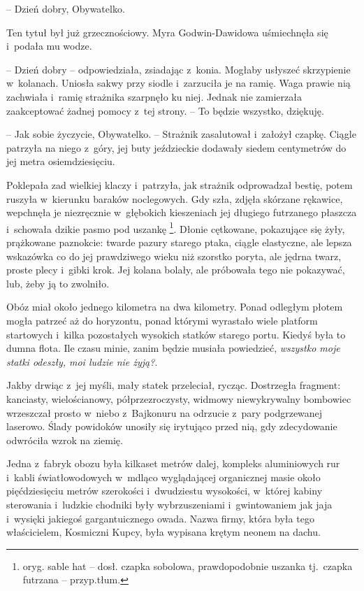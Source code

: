 \documentclass[oneside,polish,11pt,sfheadings]{mwbk}
\begin{document}
-- Dzień dobry, Obywatelko.

Ten tytuł był już grzecznościowy. Myra Godwin-Dawidowa uśmiechnęła się i~podała mu wodze.

-- Dzień dobry -- odpowiedziała, zsiadając z~konia. Mogłaby usłyszeć
skrzypienie w~kolanach. Uniosła sakwy przy siodle i~zarzuciła je na
ramię. Waga prawie nią zachwiała i~ramię strażnika szarpnęło ku niej.
Jednak nie zamierzała zaakceptować żadnej pomocy z~tej strony. -- To
będzie wszystko, dziękuję.

-- Jak sobie życzycie, Obywatelko. -- Strażnik zasalutował i~założył
czapkę. Ciągle patrzyła na niego z~góry, jej buty jeździeckie dodawały
siedem centymetrów do jej metra osiemdziesięciu.

Poklepała zad wielkiej klaczy i~patrzyła, jak strażnik odprowadzał
bestię, potem ruszyła w~kierunku baraków noclegowych. Gdy szła, zdjęła
skórzane rękawice, wepchnęła je niezręcznie w~głębokich kieszeniach jej
długiego futrzanego płaszcza i~schowała dzikie pasmo pod uszankę \footnote{
oryg. sable hat -- dosł. czapka sobolowa, prawdopodobnie uszanka tj.~czapka futrzana -- przyp.tłum.}. Dłonie cętkowane, pokazujące się żyły,
prążkowane paznokcie: twarde pazury starego ptaka, ciągle elastyczne,
ale lepsza wskazówka co do jej prawdziwego wieku niż szorstko poryta,
ale jędrna twarz, proste plecy i~gibki krok. Jej kolana bolały, ale
próbowała tego nie pokazywać, lub, żeby ją to zwolniło.

Obóz miał około jednego kilometra na dwa kilometry. Ponad odległym
płotem mogła patrzeć aż do horyzontu, ponad którymi wyrastało wiele
platform startowych i~kilka pozostałych wysokich statków starego portu.
Kiedyś była to dumna flota. Ile czasu minie, zanim będzie musiała
powiedzieć, \textit{wszystko moje statki odeszły, moi ludzie nie żyją?}.

Jakby drwiąc z~jej myśli, mały statek przeleciał, rycząc. Dostrzegła
fragment: kanciasty, wielościanowy, półprzezroczysty, widmowy
niewykrywalny bombowiec wrzeszczał prosto w~niebo z~Bajkonuru na
odrzucie z~pary podgrzewanej laserowo. Ślady powidoków unosiły się
irytująco przed nią, gdy zdecydowanie odwróciła wzrok na ziemię.

Jedna z~fabryk obozu była kilkaset metrów dalej, kompleks aluminiowych
rur i~kabli światłowodowych w~mdląco wyglądającej organicznej masie
około pięćdziesięciu metrów szerokości i~dwudziestu wysokości, w~której
kabiny sterowania i~ludzkie chodniki były wybrzuszeniami i~gwintowaniem
jak jaja i~wysięki jakiegoś gargantuicznego owada. Nazwa firmy, która
była tego właścicielem, Kosmiczni Kupcy, była wypisana krętym neonem na
dachu.
\end{document}
